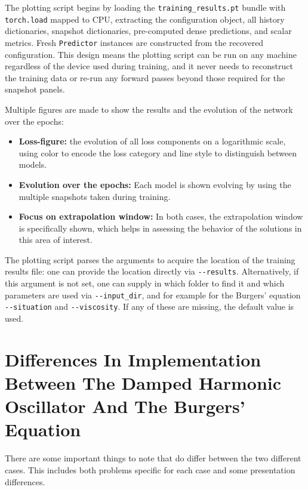 \documentclass[12pt, a4paper]{report}
\begin{document}
The plotting script begins by loading the \verb|training_results.pt| bundle with \verb|torch.load| mapped to CPU, extracting the configuration object, all history dictionaries, snapshot dictionaries, pre-computed dense predictions, and scalar metrics. Fresh \verb|Predictor| instances are constructed from the recovered configuration. This design means the plotting script can be run on any machine regardless of the device used during training, and it never needs to reconstruct the training data or re-run any forward passes beyond those required for the snapshot panels.

Multiple figures are made to show the results and the evolution of the network over the epochs:
\begin{itemize}
    \item \textbf{Loss-figure:} the evolution of all loss components on a logarithmic scale, using color to encode the loss category and line style to distinguish between models.
    \item \textbf{Evolution over the epochs:} Each model is shown evolving by using the multiple snapshots taken during training.
    \item \textbf{Focus on extrapolation window:} In both cases, the extrapolation window is specifically shown, which helps in assessing the behavior of the solutions in this area of interest. 
\end{itemize}

The plotting script parses the arguments to acquire the location of the training results file: one can provide the location directly via \verb|--results|. Alternatively, if this argument is not set, one can supply in which folder to find it and which parameters are used via \verb|--input_dir|, and for example for the Burgers' equation \verb|--situation| and \verb|--viscosity|. If any of these are missing, the default value is used.
\section{Differences In Implementation Between The Damped Harmonic Oscillator And The Burgers' Equation}
There are some important things to note that do differ between the two different cases. This includes both problems specific for each case and some presentation differences.
\end{document}
